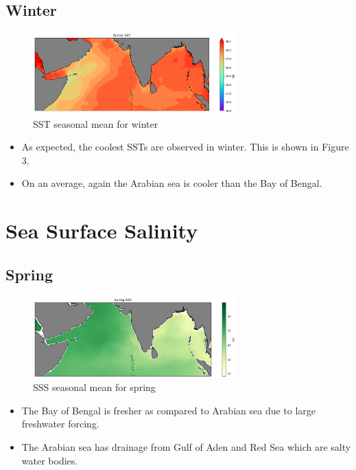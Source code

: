 \documentclass[20pt]{article}
\begin{document}
\subsection*{Winter}

\begin{figure}
    \centering
    \includegraphics[width=0.7\textwidth]{winter_sst.png}
    \caption{SST seasonal mean for winter}
\end{figure}

\begin{itemize}
    \item As expected, the coolest SSTs are observed in winter. This is shown in Figure 3.
    \item On an average, again the Arabian sea is cooler than the Bay of Bengal.
\end{itemize}


\section*{Sea Surface Salinity}

\subsection*{Spring}

\begin{figure}
    \centering
    \includegraphics[width=0.7\textwidth]{spring_sss.png}
    \caption{SSS seasonal mean for spring}
\end{figure}

\begin{itemize}
    \item The Bay of Bengal is fresher as compared to Arabian sea due to large freshwater forcing.
    \item The Arabian sea has drainage from Gulf of Aden and Red Sea which are salty water bodies.
\end{itemize}
\end{document}

